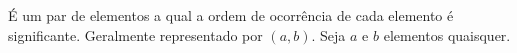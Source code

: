 \documentclass[../../main]{subfiles}
\begin{document}
    \begin{defi}\label{defi:par-ordenado}
        É um par de elementos a qual a ordem de ocorrência de cada elemento é significante. Geralmente representado por $(a,b)$. Seja $a$ e $b$ elementos quaisquer.
    \end{defi}
\end{document}
